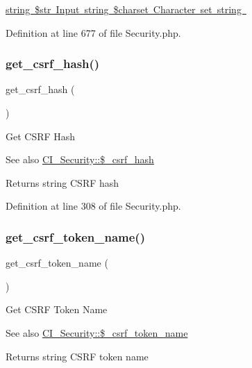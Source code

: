 \mbox{\hyperlink{}{string \$str Input  string \$charset Character set  string }}

Definition at line 677 of file Security.\+php.

\mbox{\label{class_c_i___security_a1644fd8967db3a1b94988d730ca34991}} 
\subsubsection{\texorpdfstring{get\_csrf\_hash()}{get\_csrf\_hash()}}
{\footnotesize\ttfamily get\+\_\+csrf\+\_\+hash (\begin{DoxyParamCaption}{ }\end{DoxyParamCaption})}

Get C\+S\+RF Hash

\begin{DoxySeeAlso}{See also}
\mbox{\hyperlink{class_c_i___security_a8bf24cc529f04164ac20d892ce20d721}{C\+I\+\_\+\+Security\+::\$\+\_\+csrf\+\_\+hash}} 
\end{DoxySeeAlso}
\begin{DoxyReturn}{Returns}
string C\+S\+RF hash 
\end{DoxyReturn}


Definition at line 308 of file Security.\+php.

\mbox{\label{class_c_i___security_a00640f51b90b7d946e9d3a4f0c9f628e}} 
\subsubsection{\texorpdfstring{get\_csrf\_token\_name()}{get\_csrf\_token\_name()}}
{\footnotesize\ttfamily get\+\_\+csrf\+\_\+token\+\_\+name (\begin{DoxyParamCaption}{ }\end{DoxyParamCaption})}

Get C\+S\+RF Token Name

\begin{DoxySeeAlso}{See also}
\mbox{\hyperlink{class_c_i___security_a6752ebca4be235c079785a87a693d932}{C\+I\+\_\+\+Security\+::\$\+\_\+csrf\+\_\+token\+\_\+name}} 
\end{DoxySeeAlso}
\begin{DoxyReturn}{Returns}
string C\+S\+RF token name 
\end{DoxyReturn}


